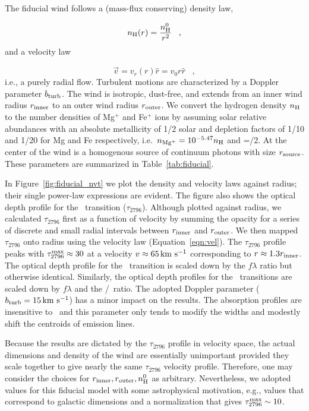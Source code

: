 \documentclass[12pt,preprint]{aastex}
\begin{document}
The fiducial wind follows a (mass-flux conserving) density law,

\begin{equation}
n_{\rm H} (r) = \frac{n^0_{\rm H}}{r^2} \;\;\; , 
\label{eqn:density}
\end{equation}
and a velocity law 

\begin{equation}
\vec v = v_r (r) \hat r = v_0 r \hat r \;\;\; , 
\label{eqn:vel}
\end{equation}
i.e., a purely radial flow.  Turbulent motions are
characterized by a Doppler parameter $b_{\rm turb}$.  
The wind is isotropic, dust-free, and extends from an inner wind
radius $r_{\rm inner}$ to an outer wind radius $r_{\rm outer}$.  
We convert the hydrogen density $n_{\rm H}$ to the number densities of
Mg$^+$ and Fe$^+$ ions by assuming solar relative abundances with an
absolute metallicity of 1/2 solar and depletion factors of 1/10 and
1/20 for Mg and Fe respectively, i.e.\  $n_{\rm Mg^+} = 10^{-5.47} n_{\rm H}$ 
and \nfe=\nmg/2. At the center of the wind is a homogenous source of
continuum photons with size $r_{\rm source}$. These parameters are
summarized in Table~\ref{tab:fiducial}.   

In Figure~\ref{fig:fiducial_nvt} we plot the density and velocity
laws against radius;  
their single power-law expressions are evident.  The figure also
shows the optical depth profile for the \mgiia\ transition ($\tau_{2796}$).
Although plotted against radius, we calculated $\tau_{2796}$ first
as a function of velocity by summing the opacity for a series of
discrete and small radial intervals
between $r_{\rm inner}$  and $r_{\rm outer}$.   We then mapped
$\tau_{2796}$ onto radius using the velocity law
(Equation~\ref{eqn:vel}). 
The $\tau_{2796}$ profile peaks with $\tau_{2796}^{\rm max} \approx 30$
at a velocity $v \approx 65 \, {\rm km~s^{-1}}$ corresponding to $r \approx 1.3
r_{\rm inner}$.  The optical depth profile for the \mgiib\ transition
is scaled down by the $f\lambda$ ratio but otherwise identical.  Similarly,
the optical depth profiles for the \feiid\ transitions are
scaled down by $f \lambda$ and the \nfe/\nmg\ ratio.  
The adopted Doppler parameter
($b_{\rm turb} = 15 \, {\rm km~s^{-1}}$) has a minor impact on the results.
The absorption profiles are insensitive to \bturb\ and this parameter 
only tends to modify the widths and modestly
shift the centroids of emission lines.

Because the results are dictated by the $\tau_{2796}$ profile in
velocity space, the actual dimensions and density of the wind are
essentially unimportant provided they scale together to give nearly the same
$\tau_{2796}$ velocity profile.  Therefore, one may consider the choices for
$r_{\rm inner}, r_{\rm outer}, n_{\rm H}^0$ as arbitrary.
Nevertheless, we adopted values for this fiducial model with
some astrophysical motivation,  e.g., values that correspond to
galactic dimensions and a normalization that gives $\tau_{2796}^{\rm
  max} \sim 10$.
\end{document}

